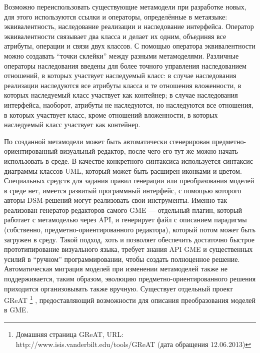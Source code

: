 Возможно переиспользовать существующие метамодели при разработке новых, для этого 
используются ссылки и операторы, определённые в метаязыке: эквивалентность, наследование 
реализации и наследование интерфейса. Оператор эквивалентности связывает два класса 
и делает их одним, объединяя все атрибуты, операции и связи двух классов. С помощью 
оператора эквивалентности можно создавать “точки склейки” между разными метамоделями. 
Различные операторы наследования введены для более точного управления наследованием 
отношений, в которых участвует наследуемый класс: в случае наследования реализации 
наследуются все атрибуты класса и те отношения вложенности, в которых наследуемый 
класс участвует как контейнер; в случае наследования интерфейса, наоборот, атрибуты 
не наследуются, но наследуются все отношения, в которых участвует класс, кроме отношений 
вложенности, в которых наследуемый класс участвует как контейнер.

По созданной метамодели может быть автоматически сгенерирован предметно-ориентированный 
визуальный редактор, после чего его тут же можно начать использовать в среде. В качестве 
конкретного синтаксиса используется синтаксис диаграммы классов UML, который может 
быть расширен иконками и цветом. Специальных средств для задания правил генерации 
или преобразования моделей в среде нет, имеется развитый программный интерфейс, с 
помощью которого авторы DSM-решений могут реализовать свои инструменты. Именно так 
реализован генератор редакторов самого GME --- отдельный плагин, который работает с 
метамоделью через API, и генерирует файл с описанием парадигмы (собственно, предметно-ориентированного 
редактора), который потом может быть загружен в среду. Такой подход, хоть и позволяет 
обеспечить достаточно быстрое прототипирование визуального языка, требует знания API GME 
и существенных усилий в "`ручном"' программировании, чтобы создать полноценное решение. 
Автоматическая миграция моделей при изменении метамоделей также не поддерживается, 
таким образом, эволюцию предметно-ориентированного решения приходится организовывать также вручную. Существует отдельный проект GReAT
\footnote{Домашняя страница GReAT, URL: http://www.isis.vanderbilt.edu/tools/GReAT (дата обращения 12.06.2013)}
, предоставляющий возможности для описания преобразования моделей в GME.

